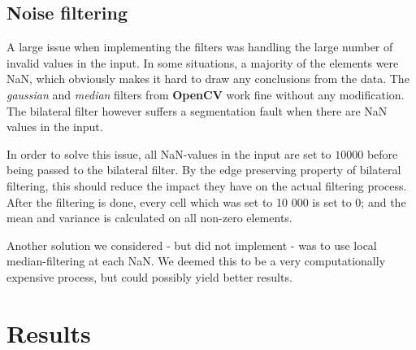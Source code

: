 \documentclass[11pt]{article}
\begin{document}
  \subsection{Noise filtering}

  A large issue when implementing the filters was handling the large number of invalid values in the input. In some situations, a majority of the elements were NaN, which obviously makes it hard to draw any conclusions from the data. The \emph{gaussian} and \emph{median} filters from \textbf{OpenCV} work fine  without any modification. The bilateral filter however suffers a segmentation fault when there are NaN values in the input. \par

  In order to solve this issue, all NaN-values in the input are set to $10000$ before being passed to the bilateral filter. By the edge preserving property of bilateral filtering, this should reduce the impact they have on the actual filtering process. After the filtering is done, every cell which was set to 10 000 is set to 0; and the mean and variance is calculated on all non-zero elements. \par
  Another solution we considered - but did not implement - was to use local median-filtering at each NaN. We deemed this to be a very computationally expensive process, but could possibly yield better results. \par

\section{Results}


\end{document}
